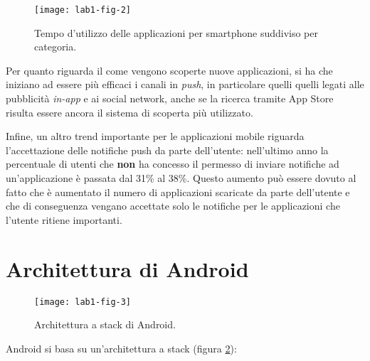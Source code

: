 \begin{figure}[htbp]
	\centering
	\texttt{[image: lab1-fig-2]}
	\caption{Tempo d'utilizzo delle applicazioni per smartphone suddiviso per categoria.}\label{lab1-fig-2}
\end{figure}


Per quanto riguarda il come vengono scoperte nuove applicazioni, si ha che iniziano ad essere più efficaci i canali in \textit{push}, in particolare quelli quelli legati alle pubblicità \textit{in-app} e ai social network, anche se la ricerca tramite App Store risulta essere ancora il sistema di scoperta più utilizzato.

Infine, un altro trend importante per le applicazioni mobile riguarda l'accettazione delle notifiche push da parte dell'utente: nell'ultimo anno la percentuale di utenti che \textbf{non} ha concesso il permesso di inviare notifiche ad un'applicazione è passata dal 31\% al 38\%.
Questo aumento può essere dovuto al fatto che è aumentato il numero di applicazioni scaricate da parte dell'utente e che di conseguenza vengano accettate solo le notifiche per le applicazioni che l'utente ritiene importanti.

\FloatBarrier
\section{Architettura di Android}\label{architettura-di-android}

\begin{figure}[htbp]
	\centering
	\texttt{[image: lab1-fig-3]}
	\caption{Architettura a stack di Android.}\label{fig:android-stack}
\end{figure}

Android si basa su un'architettura a stack (figura \ref{fig:android-stack}):

